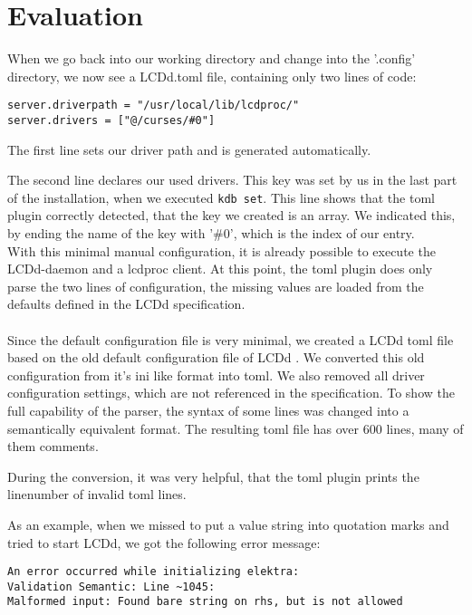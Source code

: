 \documentclass[12pt]{report}
\begin{document}
\section{Evaluation}
When we go back into our working directory and change into the '.config' directory, we now see a LCDd.toml file, containing only two lines of code:
\begin{tcolorbox}
\begin{verbatim}
server.driverpath = "/usr/local/lib/lcdproc/"
server.drivers = ["@/curses/#0"]
\end{verbatim}

\end{tcolorbox}
The first line sets our driver path and is generated automatically.

The second line declares our used drivers. This key was set by us in the last part of the installation, when we executed \texttt{kdb set}.
This line shows that the \acrshort{toml} plugin correctly detected, that the key we created is an array.
We indicated this, by ending the name of the key with '\#0', which is the index of our entry.
\\
With this minimal manual configuration, it is already possible to execute the LCDd-daemon and a lcdproc client.
At this point, the \acrshort{toml} plugin does only parse the two lines of configuration, the missing values are loaded from the defaults defined in the LCDd specification.
\\\\
Since the default configuration file is very minimal, we created a LCDd \acrshort{toml} file based on the old default configuration file of LCDd \cite{lcdprocconf}.
We converted this old configuration from it's ini like format into \acrshort{toml}.
We also removed all driver configuration settings, which are not referenced in the specification.
To show the full capability of the parser, the syntax of some lines was changed into a semantically equivalent format.
The resulting \acrshort{toml} file has over 600 lines, many of them comments.

During the conversion, it was very helpful, that the \acrshort{toml} plugin prints the linenumber of invalid \acrshort{toml} lines.

As an example, when we missed to put a value string into quotation marks and tried to start LCDd, we got the following error message:
\begin{tcolorbox}
\small
\begin{verbatim}
An error occurred while initializing elektra:
Validation Semantic: Line ~1045:
Malformed input: Found bare string on rhs, but is not allowed
\end{verbatim}
\end{tcolorbox}
\end{document}
